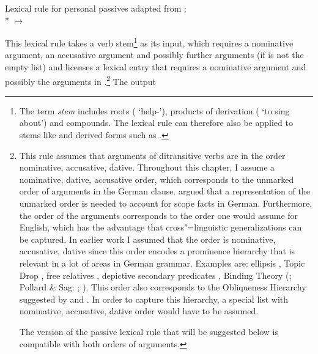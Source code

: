 \ea
\label{pass-lr-mlr}
Lexical rule for personal passives adapted from \citet{Kiss92}:\\*
 $\mapsto$ \\
\flushright{}
\z

\noindent
This lexical rule takes a verb stem\footnote{
	The term \emph{stem} includes roots ( `help-'), products of derivation
        ( `to sing about') and compounds. The lexical rule can therefore also be applied to
        stems like  and derived forms such as .%
} as its input, which requires a nominative argument, an accusative argument and possibly further arguments (if  is not the empty
list) and licenses a lexical entry that requires a nominative argument and possibly the arguments in
.\footnote{
  This rule assumes that arguments of ditransitive verbs are in the order nominative, accusative,
  dative. Throughout this chapter, I assume a nominative, dative, accusative order, which
  corresponds to the unmarked order of arguments in the German clause. \citet{Kiss2001a} argued that
  a representation of the unmarked order is needed to account for scope facts in
  German. Furthermore, the order of the arguments corresponds to the order one would assume for
  English, which has the advantage that cross"=linguistic generalizations can be captured. In
  earlier work I assumed that the order is nominative, accusative, dative since this order encodes a
  prominence hierarchy that is relevant in a lot of areas in German grammar. Examples are: ellipsis \citep{Klein85},
  Topic Drop \citep{Fries88b}, free relatives
  \citep{Bausewein90,Pittner95b,Mueller99b},
  depictive secondary predicates \citep{Mueller2001c,Mueller2002b,Mueller2008a},
  Binding Theory (\citealp{Grewendorf85a}; Pollard \& Sag: \citeyear{PS92};
  \citeyear[Chapter~6]{ps2}). This order also corresponds to the Obliqueness
  Hierarchy suggested by \citet{KC77a} and \citet{Pullum77a}. In order to capture
  this hierarchy, a special list with nominative, accusative, dative order would have to be assumed.

  The version of the passive lexical rule that will be suggested below is compatible with both orders of arguments.
} The output
